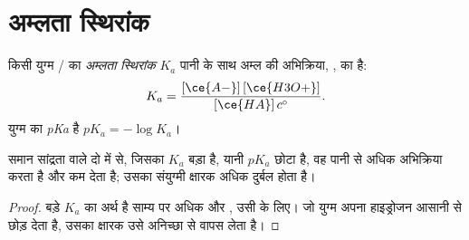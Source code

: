 \section{अम्लता स्थिरांक}

\begin{definition}[अम्लता स्थिरांक, $pK_a$]\label{def:g12:ka-and-pka:ka}
किसी युग्म / का \emph{अम्लता स्थिरांक} $K_a$
पानी के साथ अम्ल की अभिक्रिया, , का
 है:
\[
  K_a = \frac{[\ce{A-}]\,[\ce{H3O+}]}{[\ce{HA}]\,c^\circ} .
\]
युग्म का \emph{pKa} है
$pK_a = -\log K_a$।
\end{definition}

\begin{proposition}\label{prop:g12:ka-and-pka:compare}
समान सांद्रता वाले दो  में से, जिसका
$K_a$ बड़ा है, यानी $pK_a$ छोटा है, वह पानी से अधिक अभिक्रिया करता है और
कम  देता है; उसका संयुग्मी क्षारक अधिक दुर्बल होता है।
\end{proposition}

\begin{proof}
बड़े $K_a$ का अर्थ है साम्य पर अधिक  और , उसी  के लिए।
जो युग्म अपना हाइड्रोजन  आसानी से छोड़ देता है, उसका क्षारक 
उसे अनिच्छा से वापस लेता है।
\end{proof}


